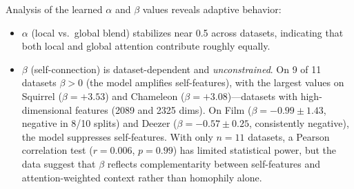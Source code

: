 \documentclass[manuscript, screen, review, anonymous]{acmart}
\begin{document}
Analysis of the learned $\alpha$ and $\beta$ values reveals adaptive behavior:

\begin{itemize}
\item $\alpha$ (local vs.~global blend) stabilizes near 0.5 across datasets, indicating that both local and global attention contribute roughly equally.

\item $\beta$ (self-connection) is dataset-dependent and \emph{unconstrained}. On 9 of 11 datasets $\beta > 0$ (the model amplifies self-features), with the largest values on Squirrel ($\beta = +3.53$) and Chameleon ($\beta = +3.08$)---datasets with high-dimensional features (2089 and 2325 dims). On Film ($\beta = -0.99 \pm 1.43$, negative in 8/10 splits) and Deezer ($\beta = -0.57 \pm 0.25$, consistently negative), the model suppresses self-features. With only $n=11$ datasets, a Pearson correlation test ($r = 0.006$, $p = 0.99$) has limited statistical power, but the data suggest that $\beta$ reflects complementarity between self-features and attention-weighted context rather than homophily alone.
\end{itemize}
\end{document}
